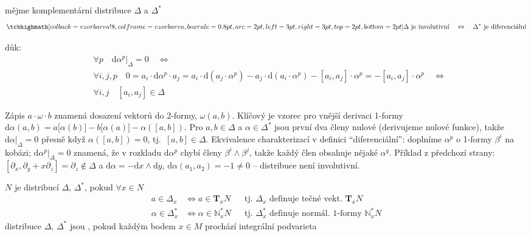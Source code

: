 \begin{veta}[Th]
mějme komplementární distribuce $\Delta$ a $\Delta^*$
\[
  \vzorec{\Delta\ \text{je involutivní}\quad\Leftrightarrow\quad\Delta^*\ \text{je diferenciální}}
\]
\end{veta}
důk:
\begin{align*}
  &\forall p \quad \mathrm{d}\alpha^{p}|_\Delta = 0 \quad\Leftrightarrow \\
  &\forall i,j,p \quad 0 = a_i\cdot\mathrm{d}\alpha^{p}\cdot a_j = a_i\cdot\mathrm{d}(a_j\cdot\alpha^{p}) - a_j\cdot\mathrm{d}(a_i\cdot\alpha^{p}) - [a_i,a_j]\cdot\alpha^{p} = -[a_i,a_j]\cdot\alpha^{p} \quad\Leftrightarrow \\
  &\forall i,j \quad [a_i,a_j]\in\Delta
\end{align*}

\begin{vysvetleni}
Zápis $a\cdot\omega\cdot b$ znamená dosazení vektorů do 2-formy, $\omega(a,b)$. Klíčový je vzorec pro vnější derivaci 1-formy
$\mathrm{d}\alpha(a,b)=a\big[\alpha(b)\big]-b\big[\alpha(a)\big]-\alpha([a,b])$.
Pro $a,b\in\Delta$ a $\alpha\in\Delta^*$ jsou první dva členy nulové (derivujeme nulové funkce), takže $\mathrm{d}\alpha|_\Delta=0$ přesně když $\alpha([a,b])=0$, tj.\ $[a,b]\in\Delta$. Ekvivalence charakterizací v definici ``diferenciální'': doplníme $\alpha^{p}$ o 1-formy $\beta^{i}$ na kobázi; $\mathrm{d}\alpha^{p}|_\Delta=0$ znamená, že v rozkladu $\mathrm{d}\alpha^{p}$ chybí členy $\beta^{i}\wedge\beta^{j}$, takže každý člen obsahuje nějaké $\alpha^{q}$.
Příklad z předchozí strany: $[\partial_x,\partial_y+x\partial_z]=\partial_z\notin\Delta$ a $\mathrm{d}\alpha=-\mathrm{d}x\wedge\mathrm{d}y$, $\mathrm{d}\alpha(a_1,a_2)=-1\neq0$ -- distribuce není involutivní.
\end{vysvetleni}

\begin{definice}
$N$ je  distribucí $\Delta$, $\Delta^*$, pokud $\forall x\in N$
\begin{align*}
  a\in\Delta_x &\Leftrightarrow a\in\mathbf{T}_xN && \text{tj.\ } \Delta_x \text{ definuje tečné vekt.\ } \mathbf{T}_xN \\
  \alpha\in\Delta^*_x &\Leftrightarrow \alpha\in\mathbb{N}^*_xN && \text{tj.\ } \Delta^*_x \text{ definuje normál.\ 1-formy } \mathbb{N}^*_xN
\end{align*}
distribuce $\Delta$, $\Delta^*$ jsou , pokud každým bodem $x\in M$ prochází integrální podvarieta
\end{definice}

